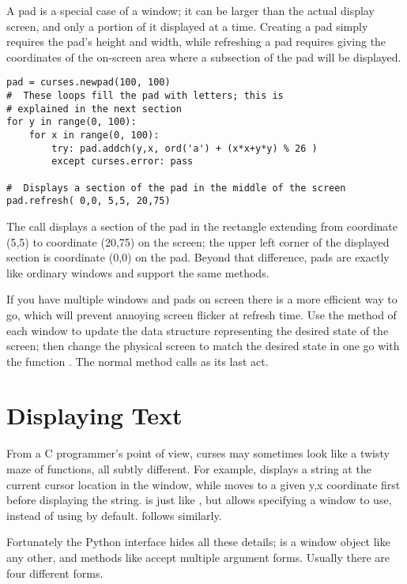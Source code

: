 \documentclass{howto}
\begin{document}
A pad is a special case of a window; it can be larger than the actual
display screen, and only a portion of it displayed at a time.
Creating a pad simply requires the pad's height and width, while
refreshing a pad requires giving the coordinates of the on-screen
area where a subsection of the pad will be displayed.  

\begin{verbatim}
pad = curses.newpad(100, 100)
#  These loops fill the pad with letters; this is
# explained in the next section
for y in range(0, 100):
    for x in range(0, 100):
        try: pad.addch(y,x, ord('a') + (x*x+y*y) % 26 )
        except curses.error: pass

#  Displays a section of the pad in the middle of the screen
pad.refresh( 0,0, 5,5, 20,75)
\end{verbatim}

The  call displays a section of the pad in the
rectangle extending from coordinate (5,5) to coordinate (20,75) on the
screen; the upper left corner of the displayed section is coordinate
(0,0) on the pad.  Beyond that difference, pads are exactly like
ordinary windows and support the same methods.

If you have multiple windows and pads on screen there is a more
efficient way to go, which will prevent annoying screen flicker at
refresh time.  Use the  method
of each window to update the data structure
representing the desired state of the screen; then change the physical
screen to match the desired state in one go with the function
.  The normal  method calls
 as its last act.

\section{Displaying Text}

{}From a C programmer's point of view, curses may sometimes look like
a twisty maze of functions, all subtly different.  For example,
 displays a string at the current cursor location
in the  window, while  moves to a
given y,x coordinate first before displaying the string.
 is just like , but allows
specifying a window to use, instead of using  by default.
 follows similarly.

Fortunately the Python interface hides all these details;
 is a window object like any other, and methods like
 accept multiple argument forms.  Usually there are
four different forms.
\end{document}
